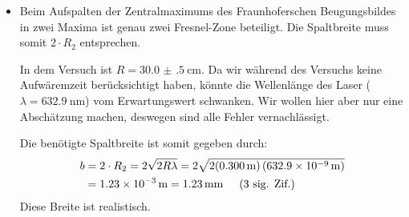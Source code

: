 \begin{itemize}
		\item {}

			Beim Aufspalten der Zentralmaximums des Fraunhoferschen Beugungsbildes in zwei Maxima ist genau zwei Fresnel-Zone beteiligt. Die Spaltbreite muss somit $2\cdot R_2$ entsprechen. 

			In dem Versuch ist $R=\SI{30.0(5)}{\centi\meter}$. Da wir während des Versuchs keine Aufwäremzeit berücksichtigt haben, könnte die Wellenlänge des Laser ($\lambda = \SI{632.9}{\nano\meter}$) vom Erwartungswert schwanken. Wir wollen hier aber nur eine Abschätzung machen, deswegen sind alle Fehler vernachlässigt.

			Die benötigte Spaltbreite ist somit gegeben durch:
			\begin{align}
				b &= 2\cdot R_2 = 2\sqrt{2R\lambda} = 2\sqrt{2(\SI{0.300}{\meter})\left(\SI{632.9e-9}{\meter}\right)} \notag \\
				&= \SI{1.23e-3}{\meter} = \SI{1.23}{\milli\meter} \hspace{0.5cm}\text{(3 sig. Zif.)}
			\end{align}
			Diese Breite ist realistisch. 
	\end{itemize}
	

